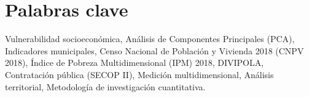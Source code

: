 \section*{Palabras clave}

\vspace{1cm}
\noindent
Vulnerabilidad socioeconómica, Análisis de Componentes Principales (PCA), Indicadores municipales, Censo Nacional de Población y Vivienda 2018 (CNPV 2018), Índice de Pobreza Multidimensional (IPM) 2018, DIVIPOLA, Contratación pública (SECOP II), Medición multidimensional, Análisis territorial, Metodología de investigación cuantitativa.